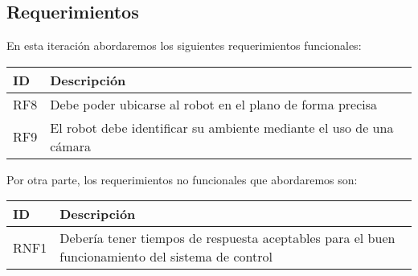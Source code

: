 \subsection{Requerimientos}
En esta iteración abordaremos los siguientes requerimientos funcionales:

\begin{center}
    \begin{tabular} {
        | >{\centering\arraybackslash}m{1cm}
        | >{\centering\arraybackslash}m{13cm} |}
        \hline \rowcolor{test_header_color}
            ID & Descripción \\
        \hline
            RF8 & Debe poder ubicarse al robot en el plano de forma precisa \\
        \hline
            RF9 & El robot debe identificar su ambiente mediante el uso de una cámara \\ 
        \hline
    \end{tabular}
\end{center}

    Por otra parte, los requerimientos no funcionales que abordaremos son:

\begin{center}
    \begin{tabular} {
        | >{\centering\arraybackslash}m{1cm}
        | >{\centering\arraybackslash}m{13cm} |}
        \hline \rowcolor{test_header_color}
            ID & Descripción \\
        \hline
            RNF1 & Debería tener tiempos de respuesta aceptables para el buen funcionamiento del sistema de control \\
        \hline
    \end{tabular}
\end{center}
